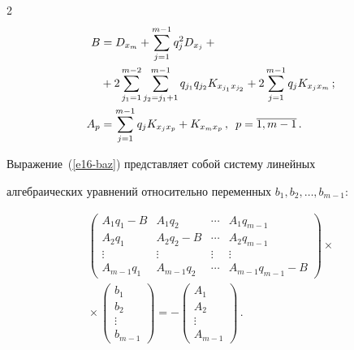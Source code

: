 \begin{multicols}{2}
\begin{align*}
B&=D_{x_m}+\sum\limits_{j=1}^{m-1}q_j^2 D_{x_j}+ {}\\


&+2\sum\limits^{m-2}_{j_1=1} 


\sum\limits^{m-1}_{j_2=j_1+1} q_{j_1} q_{j_2} K_{x_{j_1}x_{j_2}} +  


2\sum\limits^{m-1}_{j=1} q_j K_{x_j x_m}\,;\\


A_p&= \sum\limits_{j=1}^{m-1} q_j K_{x_j x_p}+K_{x_m x_p}\,,\enskip 


p=\overline{1,m-1}\,.


\end{align*} 





Выражение~(\ref{e16-baz}) представляет собой систему линейных 


алгебраических уравнений относительно переменных $b_1, b_2, \ldots , b_{m-1}$:


    \begin{multline}


    \begin{pmatrix}


A_1 q_1-B & A_1q_2&\cdots& A_1q_{m-1}\\


A_2q_1 & A_2q_2-B &\cdots & A_2 q_{m-1}\\


\vdots &\vdots& \vdots& \vdots\\


A_{m-1} q_1 & A_{m-1}q_2&\cdots & A_{m-1} q_{m-1}-B\end{pmatrix}\times{}\\


{}\times \begin{pmatrix}


b_1\\ b_2\\ \vdots \\ b_{m-1}\end{pmatrix}=


-\begin{pmatrix}


A_1 \\ A_2\\ \vdots\\ A_{m-1}


\end{pmatrix}\,.


\label{e17-baz}


\end{multline}



\end{multicols}
